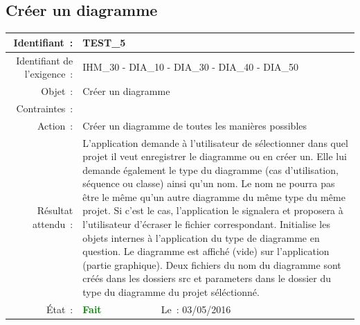 \documentclass[hidelinks, a4paper,11pt,twoside,final]{article}
\begin{document}
    \subsection*{Créer un diagramme}
    \begin{tabular}{|r|p{5cm}|p{5cm}|}\hline
    {Identifiant~:} & \multicolumn{2}{|p{10cm}|}{TEST\_5} \\\hline
    {Identifiant de l’exigence~:} & \multicolumn{2}{|p{10cm}|}{IHM\_30 - DIA\_10 - DIA\_30 - DIA\_40 - DIA\_50} \\\hline
        {Objet~:} & \multicolumn{2}{|p{10cm}|}{Créer un diagramme} \\\hline
        {Contraintes~:} & \multicolumn{2}{|p{10cm}|}{} \\\hline
        {Action~:} & \multicolumn{2}{|p{10cm}|}{Créer un diagramme de toutes les manières possibles} \\\hline
        {Résultat attendu~:} & \multicolumn{2}{|p{10cm}|}{L’application demande à l’utilisateur de sélectionner dans quel projet il veut enregistrer le diagramme ou
                             en créer un.
                             Elle lui demande également le type du diagramme (cas d’utilisation, séquence ou classe) ainsi qu’un nom.
                                     Le nom ne pourra pas être le même qu’un autre diagramme du même type du même projet. Si c’est le cas,
                                     l’application le signalera et proposera à l’utilisateur d’écraser le fichier correspondant.
                             Initialise les objets internes à l’application du type de diagramme en question.
                             Le diagramme est affiché (vide) sur l’application (partie graphique).
                             Deux fichiers du nom du diagramme sont créés dans les dossiers src et parameters
                             dans le dossier du type du diagramme du projet séléctionné.} \\\hline
        {État~:} & {\textcolor{green}{\textbf{Fait}}} & {Le~: 03/05/2016 } \\\hline
    \end{tabular}
    \\
    \newline
\end{document}
